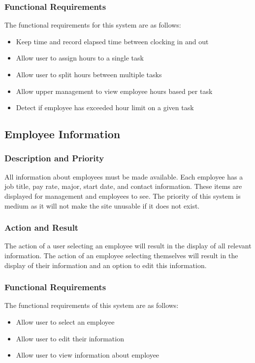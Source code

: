\documentclass[letterpaper,10pt,titlepage,journal,compsoc,draftclsnofoot,onecolumn]{IEEEtran}
\begin{document}
\subsubsection{Functional Requirements}

The functional requirements for this system are as follows:
\begin{itemize}
\item Keep time and record elapsed time between clocking in and out
\item Allow user to assign hours to a single task
\item Allow user to split hours between multiple tasks
\item Allow upper management to view employee hours based per task
\item Detect if employee has exceeded hour limit on a given task
\end{itemize}

\subsection{Employee Information}

\subsubsection{Description and Priority}

All information about employees must be made available. Each employee has a job title, pay rate, major, start date, and contact information. These items are displayed for management and employees to see. The priority of this system is medium as it will not make the site unusable if it does not exist.


\subsubsection{Action and Result}

The action of a user selecting an employee will result in the display of all relevant information. The action of an employee selecting themselves will result in the display of their information and an option to edit this information. 

\subsubsection{Functional Requirements}

The functional requirements of this system are as follows:
\begin{itemize}
\item Allow user to select an employee
\item Allow user to edit their information
\item Allow user to view information about employee
\end{itemize}
\end{document}
